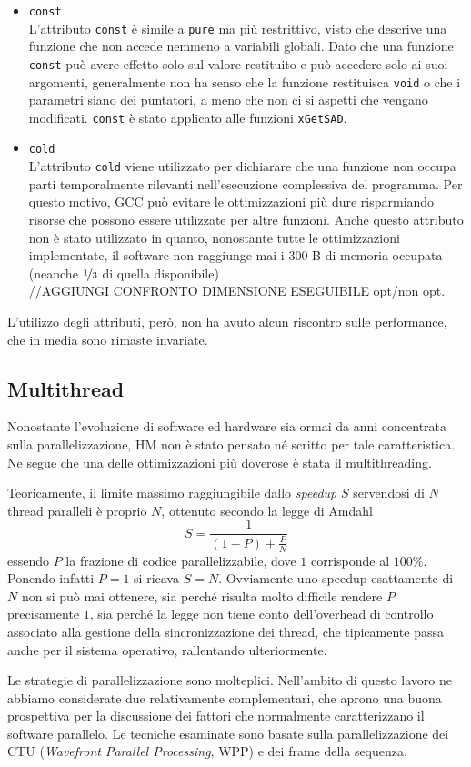 \begin{itemize}
	\item\verb|const|\\
	L'attributo \verb|const| è simile a \verb|pure| ma più restrittivo, visto 
	che descrive una funzione che non accede nemmeno a variabili globali.
	Dato che una funzione \verb|const| può avere effetto solo sul valore 
	restituito e può accedere solo ai suoi argomenti, generalmente non ha senso 
	che la funzione restituisca \verb|void| o che i parametri siano dei 
	puntatori, a meno che non ci si aspetti che vengano modificati. 
	\verb|const| è stato applicato alle funzioni \verb|xGetSAD|.
	
	\item\verb|cold|\\
	L'attributo \verb|cold| viene utilizzato per dichiarare che una funzione 
	non occupa parti temporalmente rilevanti nell'esecuzione complessiva del 
	programma. Per questo motivo, GCC può evitare le ottimizzazioni più dure 
	risparmiando risorse che possono essere utilizzate per altre funzioni. 
	Anche questo attributo non è stato utilizzato in quanto, nonostante tutte 
	le ottimizzazioni implementate, il software non raggiunge mai i $300$ B di 
	memoria occupata (neanche $\nicefrac{1}{3}$ di quella disponibile) 
	\\ //AGGIUNGI CONFRONTO DIMENSIONE ESEGUIBILE opt/non opt.
\end{itemize}

L'utilizzo degli attributi, però, non ha avuto alcun riscontro sulle 
performance, che in media sono rimaste invariate. \\
\label{sect-multi}\subsection{Multithread}
Nonostante l'evoluzione di software ed hardware sia ormai da anni concentrata 
sulla parallelizzazione, HM non è stato pensato né scritto per tale 
caratteristica. Ne segue che una delle ottimizzazioni più doverose è stata il 
multithreading.
\par Teoricamente, il limite massimo raggiungibile dallo \emph{speedup} $S$ 
servendosi 
di $N$ thread paralleli è proprio $N$, ottenuto secondo la legge di Amdahl
$$S = \frac{1}{(1-P)+\frac{P}{N}}$$
essendo $P$ la frazione di codice parallelizzabile, dove $1$ corrisponde al 
$100\%$. Ponendo infatti $P = 1$ si ricava $S = N$. Ovviamente uno speedup 
esattamente di $N$ non si può mai ottenere, sia perché risulta molto difficile 
rendere 
$P$ precisamente $1$, sia perché la legge non tiene conto dell'overhead di 
controllo associato alla gestione della sincronizzazione dei thread, che 
tipicamente passa anche per il sistema operativo, rallentando ulteriormente.
\par Le strategie di parallelizzazione sono molteplici. Nell'ambito di questo 
lavoro ne abbiamo considerate due relativamente complementari, che aprono
una buona prospettiva per la discussione dei fattori che normalmente 
caratterizzano il software parallelo. Le tecniche esaminate sono basate sulla 
parallelizzazione dei CTU (\emph{Wavefront Parallel Processing}, WPP) e dei 
frame della sequenza.

